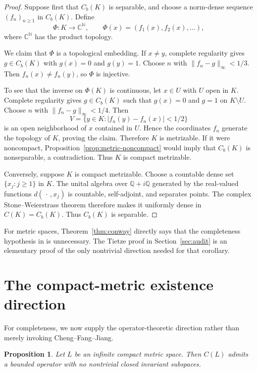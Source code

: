 \documentclass[11pt]{article}
\newtheorem{proposition}[theorem]{Proposition}
\theoremstyle{remark}
\newcommand{\Cb}{C_b}
\newcommand{\N}{\mathbb N}
\newcommand{\C}{\mathbb C}
\newcommand{\Q}{\mathbb Q}
\begin{document}
\begin{proof}
Suppose first that $\Cb(K)$ is separable, and choose a norm-dense sequence
$(f_n)_{n\geq 1}$ in $\Cb(K)$.  Define
\[
  \Phi:K\longrightarrow \C^{\N},\qquad
  \Phi(x)=(f_1(x),f_2(x),\ldots),
\]
where $\C^{\N}$ has the product topology.

We claim that $\Phi$ is a topological embedding.  If $x\neq y$, complete
regularity gives $g\in\Cb(K)$ with $g(x)=0$ and $g(y)=1$.  Choose $n$ with
$\lVert f_n-g\rVert_\infty<1/3$.  Then $f_n(x)\neq f_n(y)$, so $\Phi$ is
injective.

To see that the inverse on $\Phi(K)$ is continuous, let $x\in U$ with $U$ open
in $K$.  Complete regularity gives $g\in\Cb(K)$ such that
$g(x)=0$ and $g=1$ on $K\setminus U$.  Choose $n$ with
$\lVert f_n-g\rVert_\infty<1/4$.  Then
\[
  V=\{y\in K:|f_n(y)-f_n(x)|<1/2\}
\]
is an open neighborhood of $x$ contained in $U$.  Hence the coordinates
$f_n$ generate the topology of $K$, proving the claim.  Therefore $K$ is
metrizable.  If it were noncompact, Proposition~\ref{prop:metric-noncompact}
would imply that $\Cb(K)$ is nonseparable, a contradiction.  Thus $K$ is
compact metrizable.

Conversely, suppose $K$ is compact metrizable.  Choose a countable dense set
$\{x_j:j\geq1\}$ in $K$.  The unital algebra over $\Q+i\Q$ generated by the
real-valued functions $d(\,\cdot\,,x_j)$ is countable, self-adjoint, and
separates points.  The complex Stone--Weierstrass theorem therefore makes it
uniformly dense in $C(K)=\Cb(K)$.  Thus $\Cb(K)$ is separable.
\end{proof}

For metric spaces, Theorem~\ref{thm:conway} directly says that the
completeness hypothesis in \cite[Theorem 16.1]{CFJ} is unnecessary.  The
Tietze proof in Section~\ref{sec:audit} is an elementary proof of the only
nontrivial direction needed for that corollary.

\section{The compact-metric existence direction}\label{sec:existence}

For completeness, we now supply the operator-theoretic direction rather than
merely invoking Cheng--Fang--Jiang.

\begin{proposition}\label{prop:compact-existence}
Let $L$ be an infinite compact metric space.  Then $C(L)$ admits a bounded
operator with no nontrivial closed invariant subspaces.
\end{proposition}
\end{document}
